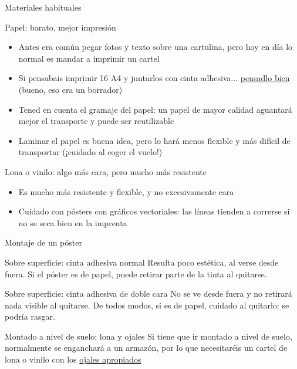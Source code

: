 \documentclass[xcolor=svgnames,compress]{beamer}
\begin{document}
\begin{frame}{Materiales habituales}
  \hypersetup{colorlinks,linkcolor=blue}

  \begin{block}{Papel: barato, mejor impresión}
    \begin{itemize}
    \item Antes era común pegar fotos y texto sobre una cartulina,
      pero hoy en día lo normal es mandar a imprimir un cartel
    \item Si pensabais imprimir 16 A4 y juntarlos con cinta
      adhesiva... \href{http://www.flickr.com/photos/damienclauzel/4465767871/}{pensadlo
        bien} (bueno, eso era un borrador)
    \item Tened en cuenta el gramaje del papel: un papel de mayor
      calidad aguantará mejor el transporte y puede ser reutilizable
    \item Laminar el papel es buena idea, pero lo hará menos flexible
      y más difícil de transportar (¡cuidado al coger el vuelo!)
    \end{itemize}
  \end{block}

  \begin{block}{Lona o vinilo: algo más cara, pero mucho más resistente}
    \begin{itemize}
    \item Es mucho más resistente y flexible, y no excesivamente cara
    \item Cuidado con pósters con gráficos vectoriales: las líneas
      tienden a correrse si no se seca bien en la imprenta
    \end{itemize}
  \end{block}

\end{frame}

\begin{frame}{Montaje de un póster}

  \begin{block}{Sobre superficie: cinta adhesiva normal}
    Resulta poco estética, al verse desde fuera. Si el póster es de
    papel, puede retirar parte de la tinta al quitarse.
  \end{block}

  \begin{block}{Sobre superficie: cinta adhesiva de doble cara}
    No se ve desde fuera y no retirará nada visible al quitarse. De
    todos modos, si es de papel, cuidado al quitarlo: se podría
    rasgar.
  \end{block}

  \begin{block}{Montado a nivel de suelo: lona y ojales}
    Si tiene que ir montado a nivel de suelo, normalmente se
    enganchará a un armazón, por lo que necesitaréis un cartel de lona
    o vinilo con los
    \href{http://www.printcolorweb.com/spa/item/index.html?msgOrigen=9\&msgValor=58\&CODART=lona}{ojales
      apropiados}
  \end{block}
  
\end{frame}
\end{document}

